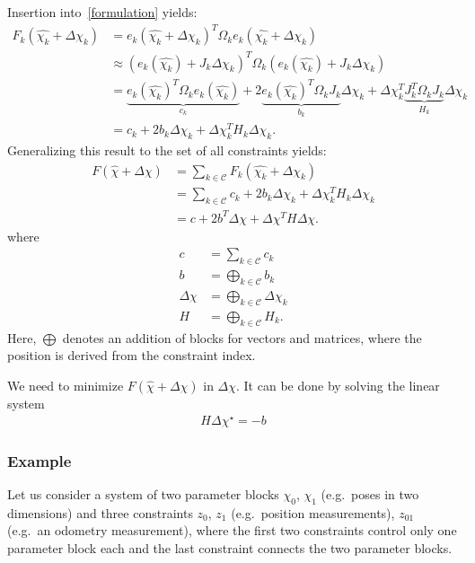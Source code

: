 Insertion into\ \ref{formulation} yields:
\begin{align}
    F_k(\hat{\chi_k}+\Delta\chi_k) &= e_k(\hat{\chi_k}+\Delta\chi_k)^{T}\Omega_k e_k(\hat{\chi_k}+\Delta\chi_k)\\
    &\approx \left(e_k(\hat{\chi_k})+J_{k}\Delta\chi_{k}\right)^T\Omega_k\left(e_k(\hat{\chi_k})+J_{k}\Delta\chi_{k}\right)\\
    &= \underbrace{e_k(\hat{\chi_k})^T\Omega_k e_k(\hat{\chi_k})}_{c_k}
    + 2\underbrace{e_k(\hat{\chi_k})^{T}\Omega_{k}J_k}_{b_k}\Delta \chi_k
    + \Delta\chi_k^T \underbrace{J_k^T\Omega_k J_k}_{H_k}\Delta \chi_k\\
    &= c_k + 2b_{k}\Delta \chi_k + \Delta \chi_k^T H_k \Delta \chi_k.
\end{align}
Generalizing this result to the set of all constraints yields:
\begin{align}
    F(\hat{\chi}+\Delta \chi) &= \sum_{k\in\mathcal{C}} F_k(\hat{\chi_k}+ \Delta\chi_k)\\
    &= \sum_{k\in\mathcal{C}} c_k + 2b_{k}\Delta \chi_k + \Delta \chi_k^T H_k \Delta \chi_k\\
    &= c + 2b^T\Delta\chi + \Delta \chi^T H \Delta \chi.
    \label{target}
\end{align}
where
\begin{align}
    c &= \sum_{k\in\mathcal{C}}c_{k}\\
    b &= \bigoplus_{k\in\mathcal{C}}b_{k}\\
    \Delta \chi &= \bigoplus_{k\in\mathcal{C}}\Delta \chi_{k}\\
    H &= \bigoplus_{k\in\mathcal{C}} H_{k}.
\end{align}
Here, $\bigoplus$ denotes an addition of blocks for vectors and matrices, where the position is derived from the constraint index.

We need to minimize $F(\hat\chi+\Delta\chi)$ in $\Delta\chi$. It can be done by solving the linear system
\begin{align}
    H\Delta\chi^\star = -b
\end{align}

\subsubsection{Example}
Let us consider a system of two parameter blocks $\chi_0$, $\chi_1$ (e.g.\ poses in two dimensions)
and three constraints $z_0$, $z_1$ (e.g.\ position measurements), $z_{01}$ (e.g.\ an odometry measurement), where the first two constraints
control only one parameter block each and the
last constraint connects the two parameter blocks.


